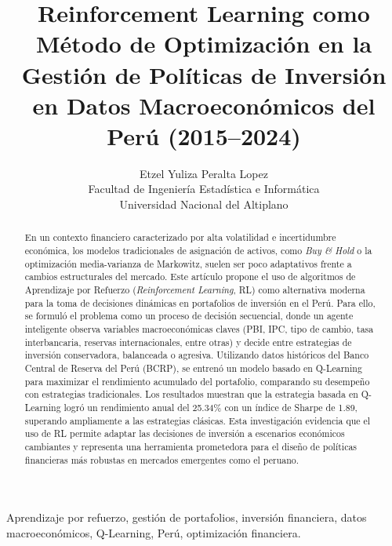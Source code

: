 \documentclass[conference]{IEEEtran}
\title{Reinforcement Learning como Método de Optimización en la Gestión de Políticas de Inversión en Datos Macroeconómicos del Perú (2015–2024)}
\author{Etzel Yuliza Peralta Lopez \\ Facultad de Ingeniería Estadística e Informática \\ Universidad Nacional del Altiplano}
\begin{document}
	
	\maketitle
	
	\begin{abstract}
		En un contexto financiero caracterizado por alta volatilidad e incertidumbre económica, los modelos tradicionales de asignación de activos, como \textit{Buy \& Hold} o la optimización media-varianza de Markowitz, suelen ser poco adaptativos frente a cambios estructurales del mercado. Este artículo propone el uso de algoritmos de Aprendizaje por Refuerzo (\textit{Reinforcement Learning}, RL) como alternativa moderna para la toma de decisiones dinámicas en portafolios de inversión en el Perú. Para ello, se formuló el problema como un proceso de decisión secuencial, donde un agente inteligente observa variables macroeconómicas claves (PBI, IPC, tipo de cambio, tasa interbancaria, reservas internacionales, entre otras) y decide entre estrategias de inversión conservadora, balanceada o agresiva. Utilizando datos históricos del Banco Central de Reserva del Perú (BCRP), se entrenó un modelo basado en Q-Learning para maximizar el rendimiento acumulado del portafolio, comparando su desempeño con estrategias tradicionales. Los resultados muestran que la estrategia basada en Q-Learning logró un rendimiento anual del 25.34\% con un índice de Sharpe de 1.89, superando ampliamente a las estrategias clásicas. Esta investigación evidencia que el uso de RL permite adaptar las decisiones de inversión a escenarios económicos cambiantes y representa una herramienta prometedora para el diseño de políticas financieras más robustas en mercados emergentes como el peruano.
	\end{abstract}
	
	\begin{IEEEkeywords}
		Aprendizaje por refuerzo, gestión de portafolios, inversión financiera, datos macroeconómicos, Q-Learning, Perú, optimización financiera.
	\end{IEEEkeywords}
	
\end{document}
